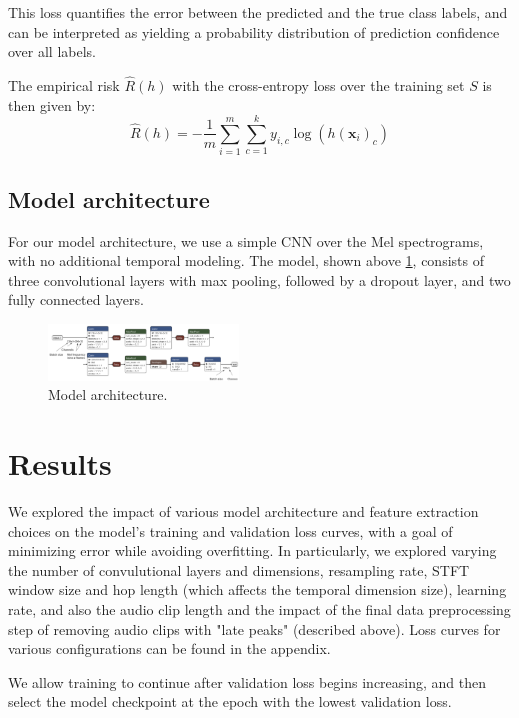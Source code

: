 \documentclass[twocolumn]{article}
\begin{document}
This loss quantifies the error between the predicted and the true class labels, and can be interpreted as yielding a probability distribution of prediction confidence over all labels.

The empirical risk \( \hat{R}(h) \) with the cross-entropy loss over the training set \( S \) is then given by:
\[ \hat{R}(h) = -\frac{1}{m} \sum_{i=1}^m \sum_{c=1}^k y_{i,c} \log(h(\mathbf{x}_i)_c) \]

\subsection{Model architecture}

For our model architecture, we use a simple CNN over the Mel spectrograms, with no additional temporal modeling.
The model, shown above \ref{fig:model_architecture}, consists of three convolutional layers with max pooling, followed by a dropout layer, and two fully connected layers.

\begin{figure}
\centering
\includegraphics[width=0.45\textwidth]{figures/model_architecture.png}
\caption{Model architecture.}
\label{fig:model_architecture}
\end{figure}

\section{Results}

We explored the impact of various model architecture and feature extraction choices on the model's training and validation loss curves, with a goal of minimizing error while avoiding overfitting.
In particularly, we explored varying the number of convulutional layers and dimensions, resampling rate, STFT window size and hop length (which affects the temporal dimension size), learning rate, and also the audio clip length and the impact of the final data preprocessing step of removing audio clips with "late peaks" (described above).
Loss curves for various configurations can be found in the appendix.

We allow training to continue after validation loss begins increasing, and then select the model checkpoint at the epoch with the lowest validation loss.
\end{document}
